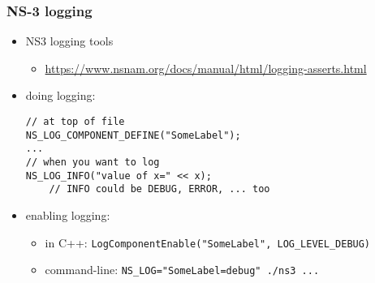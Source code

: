 \begin{FragileFrame}
\frametitle{NS-3 logging}
    \begin{itemize}
    \item NS3 logging tools
        \begin{itemize}
        \item \url{https://www.nsnam.org/docs/manual/html/logging-asserts.html}
        \end{itemize}
    \item doing logging:
\begin{Verbatim}
// at top of file
NS_LOG_COMPONENT_DEFINE("SomeLabel");
...
// when you want to log
NS_LOG_INFO("value of x=" << x);
    // INFO could be DEBUG, ERROR, ... too
\end{Verbatim}
    \item enabling logging:
        \begin{itemize}
        \item in C++: \texttt{LogComponentEnable("SomeLabel", LOG\_LEVEL\_DEBUG)}
        \item command-line: \texttt{NS\_LOG="SomeLabel=debug" ./ns3 ...}
        \end{itemize}
    \end{itemize}
\end{FragileFrame}

